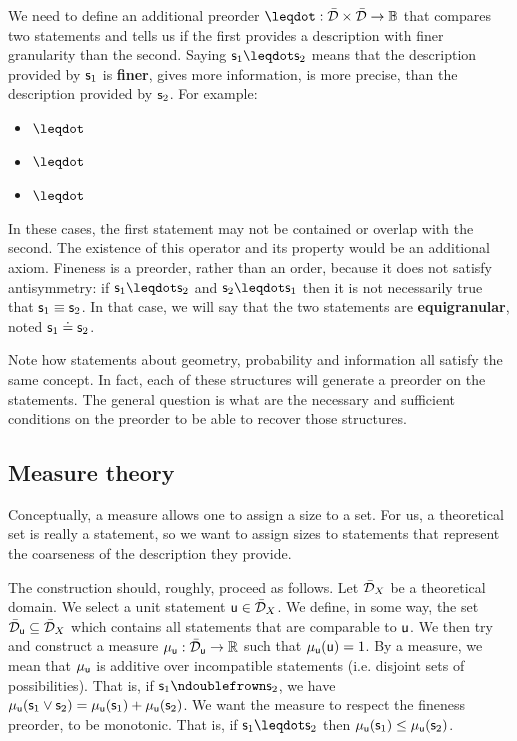 \documentclass[11pt,letterpaper,fleqn]{memoir} %
\begin{document}
We need to define an additional preorder $\finer : \tdomain \times \tdomain \to \mathbb{B}$ that compares two statements and tells us if the first provides a description with finer granularity than the second. Saying $\stmt_1 \finer \stmt_2$ means that the description provided by $\stmt_1$ is \textbf{finer}, gives more information, is more precise, than the description provided by $\stmt_2$. For example:
\begin{itemize}
	\item {} $\finer$ 
	\item {} $\finer$ 
	\item {} $\finer$ 
\end{itemize}
In these cases, the first statement may not be contained or overlap with the second. The existence of this operator and its property would be an additional axiom. Fineness is a preorder, rather than an order, because it does not satisfy antisymmetry: if $\stmt_1 \finer \stmt_2$ and $\stmt_2 \finer \stmt_1$ then it is not necessarily true that $\stmt_1 \equiv \stmt_2$. In that case, we will say that the two statements are \textbf{equigranular}, noted $\stmt_1 \eqgran \stmt_2$.

Note how statements about geometry, probability and information all satisfy the same concept. In fact, each of these structures will generate a preorder on the statements. The general question is what are the necessary and sufficient conditions on the preorder to be able to recover those structures.

\subsection{Measure theory}

Conceptually, a measure allows one to assign a size to a set. For us, a theoretical set is really a statement, so we want to assign sizes to statements that represent the coarseness of the description they provide.

The construction should, roughly, proceed as follows. Let $\tdomain_X$ be a theoretical domain. We select a unit statement $\stmt[u] \in \tdomain_X$. We define, in some way, the set $\tdomain_{\stmt[u]} \subseteq \tdomain_X$ which contains all statements that are comparable to $\stmt[u]$. We then try and construct a measure $\mu_{\stmt[u]} : \tdomain_{\stmt[u]} \to \mathbb{R}$ such that $\mu_{\stmt[u]}(\stmt[u]) = 1$. By a measure, we mean that $\mu_{\stmt[u]}$ is additive over incompatible statements (i.e. disjoint sets of possibilities). That is, if $\stmt_1 \ncomp \stmt_2$, we have $\mu_{\stmt[u]}(\stmt_1 \OR \stmt_2) = \mu_{\stmt[u]}(\stmt_1) + \mu_{\stmt[u]}(\stmt_2)$. We want the measure to respect the fineness preorder, to be monotonic. That is, if $\stmt_1 \finer \stmt_2$ then $\mu_{\stmt[u]}(\stmt_1) \leq \mu_{\stmt[u]}(\stmt_2)$.
\end{document}
